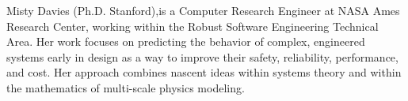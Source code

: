 \documentclass[journal]{IEEEtran}
\begin{document}
\begin{IEEEbiography}{Misty Davies}
(Ph.D. Stanford),is a Computer Research Engineer at
  NASA Ames Research Center, working within the
  Robust Software Engineering Technical Area.  Her
  work focuses on predicting the behavior of
  complex, engineered systems early in design as a
  way to improve their safety, reliability,
  performance, and cost. Her approach combines
  nascent ideas within systems theory and within the
  mathematics of multi-scale physics modeling.
\end{IEEEbiography}

\clearpage
\end{document}
